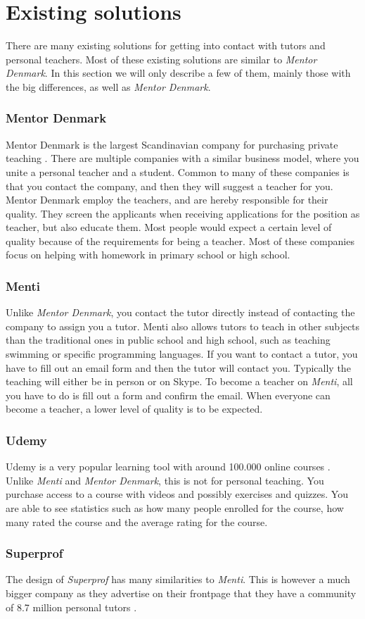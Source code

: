 \section{Existing solutions}
There are many existing solutions for getting into contact with tutors and personal teachers.
Most of these existing solutions are similar to \textit{Mentor Denmark}.  
In this section we will only describe a few of them, mainly those with the big differences, as well as \textit{Mentor Denmark}.

\subsubsection{Mentor Denmark}
Mentor Denmark is the largest Scandinavian company for purchasing private teaching \cite{skandinaviens-stoeste-lektiefirma}.
There are multiple companies with a similar business model, where you unite a personal teacher and a student. 
Common to many of these companies is that you contact the company, and then they will suggest a teacher for you.
Mentor Denmark employ the teachers, and are hereby responsible for their quality. 
They screen the applicants when receiving applications for the position as teacher, but also educate them. 
Most people would expect a certain level of quality because of the requirements for being a teacher.
Most of these companies focus on helping with homework in primary school or high school.

\subsubsection{Menti}
Unlike \textit{Mentor Denmark}, you contact the tutor directly instead of contacting the company to assign you a tutor.
Menti also allows tutors to teach in other subjects than the traditional ones in public school and high school, such as teaching swimming or specific programming languages.
If you want to contact a tutor, you have to fill out an email form and then the tutor will contact you.
Typically the teaching will either be in person or on Skype.
To become a teacher on \textit{Menti}, all you have to do is fill out a form and confirm the email.
When everyone can become a teacher, a lower level of quality is to be expected.

\subsubsection{Udemy}
Udemy is a very popular learning tool with around 100.000 online courses \cite{udemy}.
Unlike \textit{Menti} and \textit{Mentor Denmark}, this is not for personal teaching. 
You purchase access to a course with videos and possibly exercises and quizzes. 
You are able to see statistics such as how many people enrolled for the course, how many rated the course and the average rating for the course.

\subsubsection{Superprof}
The design of \textit{Superprof} has many similarities to \textit{Menti}.
This is however a much bigger company as they advertise on their frontpage that they have a community of 8.7 million personal tutors \cite{superprof}.